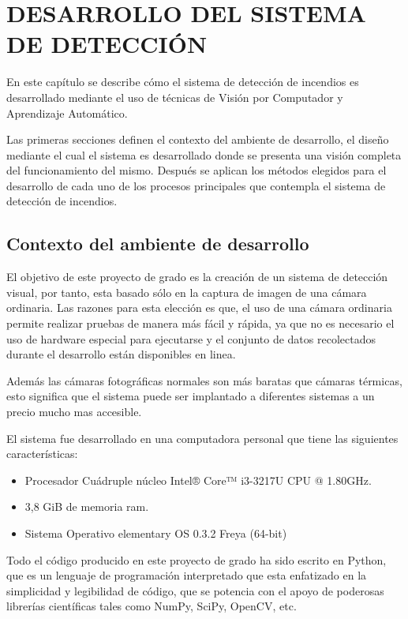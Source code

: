 \chapter{DESARROLLO DEL SISTEMA DE DETECCIÓN}

En este capítulo se describe cómo el sistema de detección de incendios es desarrollado mediante el uso de técnicas de Visión por Computador y Aprendizaje Automático.

Las primeras secciones definen el contexto del ambiente de desarrollo, el diseño mediante el cual el sistema es desarrollado donde se presenta una visión completa del funcionamiento del mismo. Después se aplican los métodos elegidos para el desarrollo de cada uno de los procesos principales que contempla el sistema de detección de incendios.

\section{Contexto del ambiente de desarrollo}

El objetivo de este proyecto de grado es la creación de un sistema de detección visual, por tanto, esta basado sólo en la captura de imagen de una cámara ordinaria. Las razones para esta elección es que, el uso de una cámara ordinaria permite realizar pruebas de manera más fácil y rápida, ya que no es necesario el uso de hardware especial para ejecutarse y el conjunto de datos recolectados durante el desarrollo están disponibles en linea.

Además las cámaras fotográficas normales son más baratas que cámaras térmicas, esto significa que el sistema puede ser implantado a diferentes sistemas a un precio mucho mas accesible.

El sistema fue desarrollado en una computadora personal que tiene las siguientes características:
\begin{itemize}
\item Procesador Cuádruple núcleo Intel® Core™ i3-3217U CPU @ 1.80GHz.
\item 3,8 GiB de memoria ram.
\item Sistema Operativo elementary OS 0.3.2 Freya (64-bit)
\end{itemize}

Todo el código producido en este proyecto de grado ha sido escrito en Python, que es un lenguaje de programación interpretado que esta enfatizado en la simplicidad y legibilidad de código, que se potencia con el apoyo de poderosas librerías científicas tales como NumPy, SciPy, OpenCV, etc.

